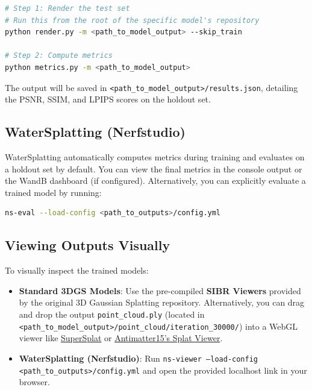 \documentclass{article}
\begin{document}
\begin{lstlisting}[language=bash]
# Step 1: Render the test set
# Run this from the root of the specific model's repository
python render.py -m <path_to_model_output> --skip_train

# Step 2: Compute metrics
python metrics.py -m <path_to_model_output>
\end{lstlisting}
The output will be saved in \texttt{<path\_to\_model\_output>/results.json}, detailing the PSNR, SSIM, and LPIPS scores on the holdout set.

\subsection{WaterSplatting (Nerfstudio)}
WaterSplatting automatically computes metrics during training and evaluates on a holdout set by default. You can view the final metrics in the console output or the WandB dashboard (if configured). Alternatively, you can explicitly evaluate a trained model by running:
\begin{lstlisting}[language=bash]
ns-eval --load-config <path_to_outputs>/config.yml
\end{lstlisting}

\subsection{Viewing Outputs Visually}
To visually inspect the trained models:
\begin{itemize}
    \item \textbf{Standard 3DGS Models}: Use the pre-compiled \textbf{SIBR Viewers} provided by the original 3D Gaussian Splatting repository. Alternatively, you can drag and drop the output \texttt{point\_cloud.ply} (located in \texttt{<path\_to\_model\_output>/point\_cloud/iteration\_30000/}) into a WebGL viewer like \href{https://playcanvas.com/supersplat/editor}{SuperSplat} or \href{https://antimatter15.com/splat/}{Antimatter15's Splat Viewer}.
    \item \textbf{WaterSplatting (Nerfstudio)}: Run \texttt{ns-viewer --load-config <path\_to\_outputs>/config.yml} and open the provided localhost link in your browser.
\end{itemize}
\end{document}
